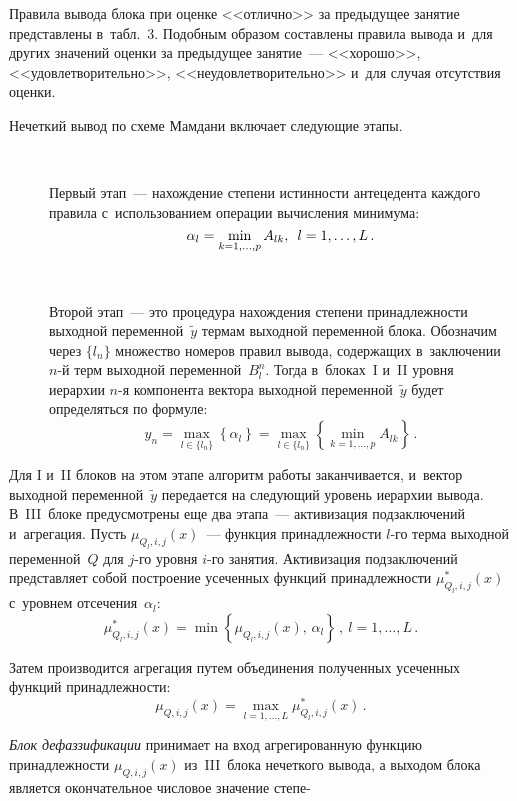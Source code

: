 \begin{multicols}{2}
  Правила вывода блока при оценке <<отлично>> за предыдущее занятие 
представлены в~табл.~3. Подобным образом составлены правила вывода и~для 
других значений оценки за предыдущее занятие~--- <<хорошо>>, 
<<удовлетворительно>>, <<неудовлетворительно>> и~для случая отсутствия 
оценки.
  

  

  
  Нечеткий вывод по схеме Мамдани включает следующие этапы.
  \begin{description}
\item[\,]  Первый этап~--- нахождение степени истинности антецедента каждого 
правила с~использованием операции вычисления минимума: 
$$
\alpha_l= 
\min\limits_{k=1,\ldots, p} A_{lk},\enskip l\hm = 1,\ldots, L\,.
$$
\item[\,]  
  Второй этап~--- это процедура нахождения степени принадлежности 
выходной переменной~$\tilde{y}$ термам выходной переменной блока. 
Обозначим через $\{l_n\}$ множество номеров правил вывода, содержащих 
в~заключении $n$-й терм выходной переменной~$B_l^n$. Тогда в~блоках~I 
и~II уровня иерархии $n$-я компонента вектора выходной 
переменной~$\tilde{y}$ будет определяться по формуле:
  $$
  y_n= \max\limits_{l\in \{l_n\}} \left\{ \alpha_l\right\} =\max\limits_{l\in \{l_n\}} 
\left\{ \min\limits_{k=1,\ldots, p} A_{lk}\right\}\,.
  $$
  \end{description}
  
  Для I и~II блоков на этом этапе алгоритм работы заканчивается, и~вектор 
выходной переменной~$\tilde{y}$ передается на следующий уровень иерархии 
вывода. В~III~блоке предусмотрены еще два этапа~--- активизация 
подзаключений и~агрегация. Пусть $\mu_{Q_l,i,j}(x)$~--- функция 
принадлежности $l$-го терма выходной переменной~$Q$ для $j$-го уровня 
$i$-го занятия. Активизация подзаключений представляет собой построение 
усеченных функций принадлежности $\mu^*_{Q_l,i,j}(x)$ с~уровнем 
отсечения~$\alpha_l$:
  $$
  \mu^*_{Q_l,i,j}(x)=\min\left\{ \mu_{Q_l,i,j}(x),\,\alpha_l\right\}\,,\ l=1,\ldots, L\,.
  $$
  
  Затем производится агрегация путем объединения полученных усеченных 
функций принадлежности: 
$$
\mu_{Q,i,j}(x)= \max\limits_{l=1,\ldots, L} 
\mu^*_{Q_l,i,j}(x)\,.
$$
  
  \textit{Блок дефаззификации} принимает на вход агрегированную функцию 
принадлежности $\mu_{Q,i,j}(x)$ из~III~блока нечеткого вывода, а выходом 
блока является окончательное числовое значение степе-\linebreak\vspace*{-12pt}


\end{multicols}
